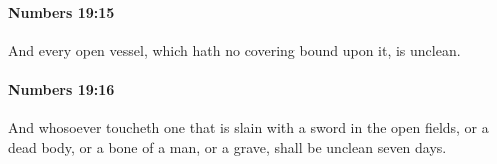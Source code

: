 		\paragraph{Numbers 19:15} %
			\label{NUMBERS-19-15}

			And every open vessel, which hath no covering bound upon it, is unclean.


		\paragraph{Numbers 19:16} %
			\label{NUMBERS-19-16}

			And whosoever toucheth one that is slain with a sword in the open fields, or a dead body, or a bone of a man, or a grave, shall be unclean seven days.


